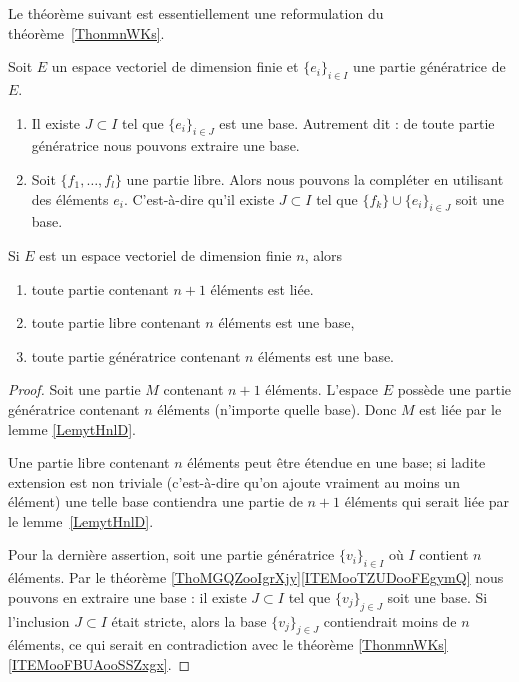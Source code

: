Le théorème suivant est essentiellement une reformulation du théorème~\ref{ThonmnWKs}.
\begin{theorem} \label{ThoMGQZooIgrXjy}
    Soit \( E\) un espace vectoriel de dimension finie et \( \{ e_i \}_{i\in I}\) une partie génératrice de \( E\).

    \begin{enumerate}
        \item       \label{ITEMooTZUDooFEgymQ}
            Il existe \( J\subset I\) tel que \( \{ e_i \}_{i\in J}\) est une base. Autrement dit : de toute partie génératrice nous pouvons extraire une base.
        \item       \label{ITEMooCJQGooXwjsfm}
            Soit \( \{ f_1,\ldots, f_l \}\) une partie libre. Alors nous pouvons la compléter en utilisant des éléments \( e_i\). C'est-à-dire qu'il existe \( J\subset I\) tel que \( \{ f_k \}\cup\{ e_i \}_{i\in J}\) soit une base.
    \end{enumerate}
\end{theorem}

\begin{proposition}     \label{PROPooVEVCooHkrldw}
    Si \( E\) est un espace vectoriel de dimension finie \( n\), alors 
    \begin{enumerate}
        \item       \label{ITEMooZNLDooBISkJyBS}
            toute partie contenant \( n+1\) éléments est liée.
        \item       \label{ITEMooSGGCooOUsuBs}
            toute partie libre contenant \( n\) éléments est une base,
        \item
            toute partie génératrice contenant \( n\) éléments est une base.
    \end{enumerate}
\end{proposition}

\begin{proof}
    Soit une partie \( M\) contenant \( n+1\) éléments. L'espace \( E\) possède une partie génératrice contenant \( n\) éléments (n'importe quelle base). Donc \( M\) est liée par le lemme \ref{LemytHnlD}.

    Une partie libre contenant \( n\) éléments peut être étendue en une base; si ladite extension est non triviale (c'est-à-dire qu'on ajoute vraiment au moins un élément) une telle base contiendra une partie de \( n+1\) éléments qui serait liée par le lemme~\ref{LemytHnlD}.

    Pour la dernière assertion, soit une partie génératrice \( \{ v_i \}_{i\in I}\) où \( I\) contient \( n\) éléments. Par le théorème \ref{ThoMGQZooIgrXjy}\ref{ITEMooTZUDooFEgymQ} nous pouvons en extraire une base : il existe \( J\subset I\) tel que \( \{ v_j \}_{j\in J}\) soit une base. Si l'inclusion \( J\subset I\) était stricte, alors la base \( \{ v_j \}_{j\in J}\) contiendrait moins de \( n\) éléments, ce qui serait en contradiction avec le théorème \ref{ThonmnWKs}\ref{ITEMooFBUAooSSZxgx}.
\end{proof}

